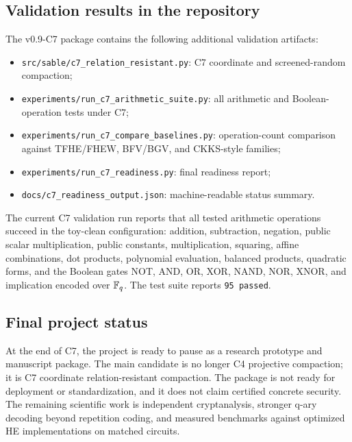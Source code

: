 \subsection{Validation results in the repository}

The v0.9-C7 package contains the following additional validation artifacts:
\begin{itemize}
    \item \texttt{src/sable/c7\_relation\_resistant.py}: C7 coordinate and screened-random compaction;
    \item \texttt{experiments/run\_c7\_arithmetic\_suite.py}: all arithmetic and Boolean-operation tests under C7;
    \item \texttt{experiments/run\_c7\_compare\_baselines.py}: operation-count comparison against TFHE/FHEW, BFV/BGV, and CKKS-style families;
    \item \texttt{experiments/run\_c7\_readiness.py}: final readiness report;
    \item \texttt{docs/c7\_readiness\_output.json}: machine-readable status summary.
\end{itemize}

The current C7 validation run reports that all tested arithmetic operations
succeed in the toy-clean configuration: addition, subtraction, negation,
public scalar multiplication, public constants, multiplication, squaring,
affine combinations, dot products, polynomial evaluation, balanced products,
quadratic forms, and the Boolean gates NOT, AND, OR, XOR, NAND, NOR, XNOR, and
implication encoded over $\mathbb{F}_q$.  The test suite reports \texttt{95 passed}.

\subsection{Final project status}

At the end of C7, the project is ready to pause as a research prototype and
manuscript package.  The main candidate is no longer C4 projective compaction;
it is C7 coordinate relation-resistant compaction.  The package is not ready
for deployment or standardization, and it does not claim certified concrete
security.  The remaining scientific work is independent cryptanalysis,
stronger q-ary decoding beyond repetition coding, and measured benchmarks
against optimized HE implementations on matched circuits.

